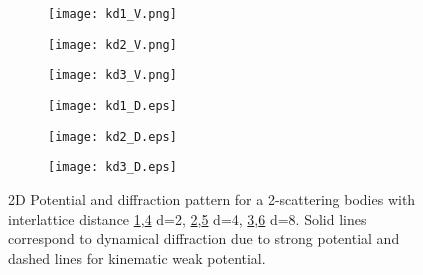 \documentclass[a4paper,10pt]{article}
\begin{document}
\begin{figure}
	\begin{subfigure}{0.3\textwidth}
		\centering
		\texttt{[image: kd1\_V.png]}
		\caption{}\label{fig:singleArray_kd1_V}
	\end{subfigure}
	\begin{subfigure}{0.3\textwidth}
		\centering
		\texttt{[image: kd2\_V.png]}
		\caption{}\label{fig:singleArray_kd2_V}
	\end{subfigure}
	\begin{subfigure}{0.3\textwidth}
		\centering
		\texttt{[image: kd3\_V.png]}
		\caption{}\label{fig:singleArray_kd3_V}
	\end{subfigure}

	\begin{subfigure}{0.3\textwidth}
		\centering
		\texttt{[image: kd1\_D.eps]}
		\caption{}\label{fig:singleArray_kd1_D}
	\end{subfigure}
	\begin{subfigure}{0.3\textwidth}
		\centering
		\texttt{[image: kd2\_D.eps]}
		\caption{}\label{fig:singleArray_kd2_D}
	\end{subfigure}
	\begin{subfigure}{0.3\textwidth}
		\centering
		\texttt{[image: kd3\_D.eps]}
		\caption{}\label{fig:singleArray_kd3_D}
	\end{subfigure}

	\caption[single array interllatice distance]{
	2D Potential and diffraction pattern for a 2-scattering bodies with interlattice distance
	\ref{fig:singleArray_kd1_V},\ref{fig:singleArray_kd1_D} d=2,
	\ref{fig:singleArray_kd2_V},\ref{fig:singleArray_kd2_D} d=4,
	\ref{fig:singleArray_kd3_V},\ref{fig:singleArray_kd3_D} d=8.
	Solid lines correspond to dynamical diffraction due to strong potential and
	dashed lines for kinematic weak potential.
	}\label{fig:singleArray_kd}
\end{figure}
\end{document}
